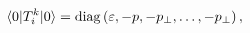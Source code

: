 \begin{equation}
\langle 0|T_{i}^{k}|0\rangle ={\rm diag}\left( \varepsilon
,-p,-p_{\perp },\ldots ,-p_{\perp }\right) ,  \label{diagEMT}
\end{equation}

